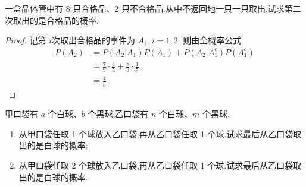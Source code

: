\documentclass[../main.tex]{subfiles}
\begin{document}
\begin{exercise}{}{}
一盒晶体管中有 8 只合格品、2 只不合格品.从中不返回地一只一只取出,试求第二次取出的是合格品的概率.
\end{exercise}

\begin{proof}
    记第 \(  i  \)次取出合格品的事件为 \(  A_{i}  \), \(  i= 1,2  \). 则由全概率公式 \[
    \begin{aligned}
    P\left( A_{2} \right)&=  P\left( A_{2}|A_{1} \right)P\left( A_{1} \right)+ P\left( A_{2}|A_{1}^{c} \right)P\left( A_{1}^{c} \right)\\ 
     &= \frac{7 }{9 }\cdot \frac{4 }{5 }+ \frac{8 }{9 }\cdot \frac{1 }{5 }\\ 
      &= \frac{4 }{5 }           
    \end{aligned}
    \]   
\end{proof}
\begin{exercise}{}{}
甲口袋有 $a$ 个白球、$b$ 个黑球,乙口袋有 $n$ 个白球、$m$ 个黑球.
\begin{enumerate}
    \item 从甲口袋任取 1 个球放入乙口袋,再从乙口袋任取 1 个球.试求最后从乙口袋取出的是白球的概率;
    \item 从甲口袋任取 2 个球放入乙口袋,再从乙口袋任取 1 个球.试求最后从乙口袋取出的是白球的概率.
\end{enumerate}
\end{exercise}
\end{document}
